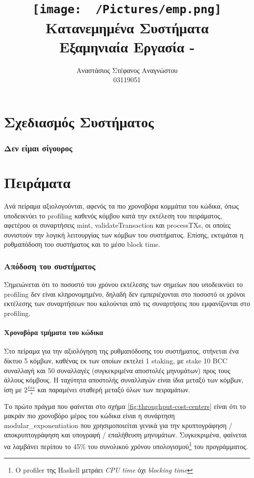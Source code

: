 \documentclass{article}
\title{
    \texttt{[image: ~/Pictures/emp.png]} \\
    \vskip 5cm
    Κατανεμημένα Συστήματα \\
    \large Εξαμηνιαία Εργασία - \eng{BlockChat} 
    \vskip 5cm
}
\author{ Αναστάσιος Στέφανος Αναγνώστου \\ \large 03119051 }
\newcommand{\eng}[1]{\foreignlanguage{english}{#1}} %
\begin{document}
\maketitle \clearpage \tableofcontents \clearpage

\part{Σχεδιασμός Συστήματος}

\section{Δεν είμαι σίγουρος}

\clearpage
\part{Πειράματα}

Ανά πείραμα αξιολογούνται, αφενός τα πιο χρονοβόρα κομμάτια του κώδικα, όπως
υποδεικνύει το \eng{profiling} καθενός κόμβου κατά την εκτέλεση του πειράματος,
αφετέρου οι συναρτήσεις \eng{mint}, \eng{validateTransaction} και
\eng{processTXs}, οι οποίες συνιστούν την λογική λειτουργίας των κόμβων του
συστήματος. Επίσης, εκτιμάται η ρυθμαπόδοση του συστήματος και το μέσο
\eng{block time}.

\section{Απόδοση του συστήματος}

Σημειώνεται ότι το ποσοστό του χρόνου εκτέλεσης των σημείων που υποδεικνύει το
\eng{profiling} δεν είναι κληρονομημένο, δηλαδή δεν εμπεριέχονται στο ποσοστό
οι χρόνοι εκτέλεσης των συναρτήσεων που καλούνται από τις συναρτήσεις που
εμφανίζονται στο \eng{profiling}.

\subsection{Χρονοβόρα τμήματα του κώδικα}

Στο πείραμα για την αξιολόγηση της ρυθμαπόδοσης του συστήματος, στήνεται ένα
δίκτυο 5 κόμβων, καθένας εκ των οποίων εκτελεί 1 \eng{staking}, με \eng{stake
10 BCC} συναλλαγή και 50 συναλλαγές (συγκεκριμένα αποστολές μηνυμάτων) προς
τους άλλους κόμβους. Η ταχύτητα αποστολής συναλλαγών είναι ίδια μεταξύ των
κόμβων, ίση με $2\frac{txs}{s}$ και παραμένει σταθερή μεταξύ όλων των
πειραμάτων.

Το πρώτο πράγμα που φαίνεται στο σχήμα \ref{fig:throughput-cost-centers} είναι
ότι το μακράν πιο χρονοβόρο μέρος του κώδικα είναι η συνάρτηση
\eng{modular\_exponentiation} που χρησιμοποιείται γενικά για την κρυπτογράφηση
/ αποκρυπτογράφηση και υπογραφή / επαλήθευση μηνυμάτων. Συγκεκριμένα, φαίνεται
να λαμβάνει περίπου το 45\% του συνολικού χρόνου υπολογισμού\footnote{Ο
\eng{profiler} της \eng{Haskell} μετράει \emph{\eng{CPU time}} όχι
\emph{\eng{blocking time}}} του προγράμματος.
\end{document}
